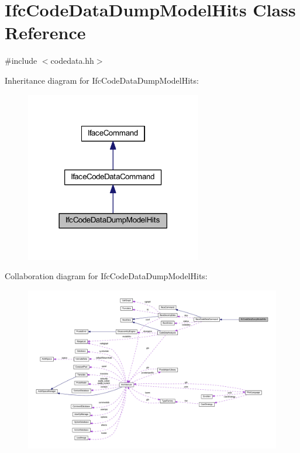 \hypertarget{class_ifc_code_data_dump_model_hits}{}\section{Ifc\+Code\+Data\+Dump\+Model\+Hits Class Reference}
\label{class_ifc_code_data_dump_model_hits}


{\ttfamily \#include $<$codedata.\+hh$>$}



Inheritance diagram for Ifc\+Code\+Data\+Dump\+Model\+Hits\+:
\nopagebreak
\begin{figure}[H]
\begin{center}
\leavevmode
\includegraphics[width=218pt]{class_ifc_code_data_dump_model_hits__inherit__graph}
\end{center}
\end{figure}


Collaboration diagram for Ifc\+Code\+Data\+Dump\+Model\+Hits\+:
\nopagebreak
\begin{figure}[H]
\begin{center}
\leavevmode
\includegraphics[width=350pt]{class_ifc_code_data_dump_model_hits__coll__graph}
\end{center}
\end{figure}

